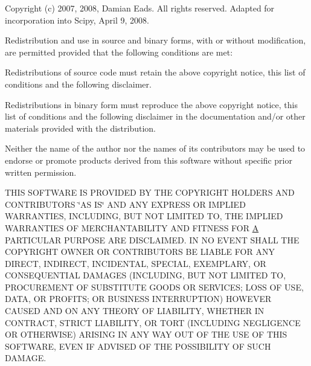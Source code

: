 Copyright (c) 2007, 2008, Damian Eads. All rights reserved. Adapted for incorporation into Scipy, April 9, 2008.

Redistribution and use in source and binary forms, with or without modification, are permitted provided that the following conditions are met\+:
\begin{DoxyItemize}
\item Redistributions of source code must retain the above copyright notice, this list of conditions and the following disclaimer.
\item Redistributions in binary form must reproduce the above copyright notice, this list of conditions and the following disclaimer in the documentation and/or other materials provided with the distribution.
\item Neither the name of the author nor the names of its contributors may be used to endorse or promote products derived from this software without specific prior written permission.
\end{DoxyItemize}

T\+H\+I\+S S\+O\+F\+T\+W\+A\+R\+E I\+S P\+R\+O\+V\+I\+D\+E\+D B\+Y T\+H\+E C\+O\+P\+Y\+R\+I\+G\+H\+T H\+O\+L\+D\+E\+R\+S A\+N\+D C\+O\+N\+T\+R\+I\+B\+U\+T\+O\+R\+S \char`\"{}\+A\+S I\+S\char`\"{} A\+N\+D A\+N\+Y E\+X\+P\+R\+E\+S\+S O\+R I\+M\+P\+L\+I\+E\+D W\+A\+R\+R\+A\+N\+T\+I\+E\+S, I\+N\+C\+L\+U\+D\+I\+N\+G, B\+U\+T N\+O\+T L\+I\+M\+I\+T\+E\+D T\+O, T\+H\+E I\+M\+P\+L\+I\+E\+D W\+A\+R\+R\+A\+N\+T\+I\+E\+S O\+F M\+E\+R\+C\+H\+A\+N\+T\+A\+B\+I\+L\+I\+T\+Y A\+N\+D F\+I\+T\+N\+E\+S\+S F\+O\+R \hyperlink{classA}{A} P\+A\+R\+T\+I\+C\+U\+L\+A\+R P\+U\+R\+P\+O\+S\+E A\+R\+E D\+I\+S\+C\+L\+A\+I\+M\+E\+D. I\+N N\+O E\+V\+E\+N\+T S\+H\+A\+L\+L T\+H\+E C\+O\+P\+Y\+R\+I\+G\+H\+T O\+W\+N\+E\+R O\+R C\+O\+N\+T\+R\+I\+B\+U\+T\+O\+R\+S B\+E L\+I\+A\+B\+L\+E F\+O\+R A\+N\+Y D\+I\+R\+E\+C\+T, I\+N\+D\+I\+R\+E\+C\+T, I\+N\+C\+I\+D\+E\+N\+T\+A\+L, S\+P\+E\+C\+I\+A\+L, E\+X\+E\+M\+P\+L\+A\+R\+Y, O\+R C\+O\+N\+S\+E\+Q\+U\+E\+N\+T\+I\+A\+L D\+A\+M\+A\+G\+E\+S (I\+N\+C\+L\+U\+D\+I\+N\+G, B\+U\+T N\+O\+T L\+I\+M\+I\+T\+E\+D T\+O, P\+R\+O\+C\+U\+R\+E\+M\+E\+N\+T O\+F S\+U\+B\+S\+T\+I\+T\+U\+T\+E G\+O\+O\+D\+S O\+R S\+E\+R\+V\+I\+C\+E\+S; L\+O\+S\+S O\+F U\+S\+E, D\+A\+T\+A, O\+R P\+R\+O\+F\+I\+T\+S; O\+R B\+U\+S\+I\+N\+E\+S\+S I\+N\+T\+E\+R\+R\+U\+P\+T\+I\+O\+N) H\+O\+W\+E\+V\+E\+R C\+A\+U\+S\+E\+D A\+N\+D O\+N A\+N\+Y T\+H\+E\+O\+R\+Y O\+F L\+I\+A\+B\+I\+L\+I\+T\+Y, W\+H\+E\+T\+H\+E\+R I\+N C\+O\+N\+T\+R\+A\+C\+T, S\+T\+R\+I\+C\+T L\+I\+A\+B\+I\+L\+I\+T\+Y, O\+R T\+O\+R\+T (I\+N\+C\+L\+U\+D\+I\+N\+G N\+E\+G\+L\+I\+G\+E\+N\+C\+E O\+R O\+T\+H\+E\+R\+W\+I\+S\+E) A\+R\+I\+S\+I\+N\+G I\+N A\+N\+Y W\+A\+Y O\+U\+T O\+F T\+H\+E U\+S\+E O\+F T\+H\+I\+S S\+O\+F\+T\+W\+A\+R\+E, E\+V\+E\+N I\+F A\+D\+V\+I\+S\+E\+D O\+F T\+H\+E P\+O\+S\+S\+I\+B\+I\+L\+I\+T\+Y O\+F S\+U\+C\+H D\+A\+M\+A\+G\+E. \hypertarget{scipy-0_814_80_2scipy_2cluster_2src_2common_8h_a854cb1cc38fe7c993ba776d0abf73c0a}{}
